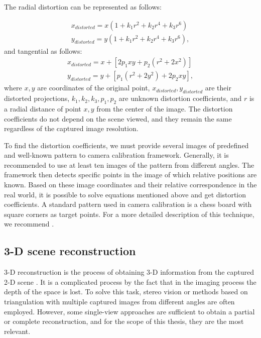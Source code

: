        The radial distortion can be represented as follows:

        \begin{align}
            x_{distorted} = x( 1 + k_1 r^2 + k_2 r^4 + k_3 r^6) \\ 
            y_{distorted} = y( 1 + k_1 r^2 + k_2 r^4 + k_3 r^6),
        \end{align}
        and tangential as follows:
        \begin{align}
            x_{distorted} = x + [ 2p_1xy + p_2(r^2+2x^2)] \\
            y_{distorted} = y + [ p_1(r^2+ 2y^2)+ 2p_2xy],
        \end{align}
        where $x, y$ are coordinates of the original point, $x_{distorted}, y_{distorted}$ are their distorted projections, $k_1, k_2, k_3, p_1, p_2$ are unknown distortion coefficients, and $r$ is a radial distance of point $x, y$ from the center of the image. The distortion coefficients do not depend on the scene viewed, and they remain the same regardless of the captured image resolution.
        
        To find the distortion coefficients, we must provide several images of predefined and well-known pattern to camera calibration framework. Generally, it is recommended to use at least ten images of the pattern from different angles. The framework then detects specific points in the image of which relative positions are known. Based on these image coordinates and their relative correspondence in the real world, it is possible to solve equations mentioned above and get distortion coefficients. A standard pattern used in camera calibration is a chess board with square corners as target points. For a more detailed description of this technique, we recommend \cite{zhang1999flexible}.

    \subsection{3-D scene reconstruction}\label{scene_reconstruction}
        3-D reconstruction is the process of obtaining 3-D information from the captured 2-D scene \cite{hartley2003multiple}. It is a complicated process by the fact that in the imaging process the depth of the space is lost. To solve this task, stereo vision or methods based on triangulation with multiple captured images from different angles are often employed. However, some single-view approaches are sufficient to obtain a partial or complete reconstruction, and for the scope of this thesis, they are the most relevant.
        
